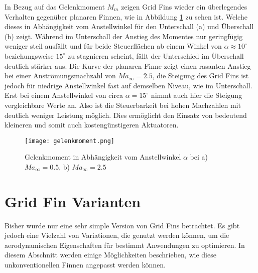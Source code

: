 In Bezug auf das Gelenkmoment $M_m$ zeigen Grid Fins wieder ein überlegendes Verhalten gegenüber planaren Finnen, wie in Abbildung \ref{abb_Mm-AoA} zu sehen ist. Welche dieses in Abhängigkeit vom Anstellwinkel für den Unterschall (a) und Überschall (b) zeigt. Während im Unterschall der Anstieg des Momentes nur geringfügig weniger steil ausfällt und für beide Steuerflächen ab einem Winkel von $\alpha \approx 10^\circ$ beziehungsweise $15^\circ$ zu stagnieren scheint, fällt der Unterschied im Überschall deutlich stärker aus. Die Kurve der planaren Finne zeigt einen rasanten Anstieg bei einer Anströmungsmachzahl von $Ma_\infty = 2.5$, die Steigung des Grid Fins ist jedoch für niedrige Anstellwinkel fast auf demselben Niveau, wie im Unterschall. Erst bei einem Anstellwinkel von circa $\alpha = 15^\circ$ nimmt auch hier die Steigung vergleichbare Werte an. Also ist die Steuerbarkeit bei hohen Machzahlen mit deutlich weniger Leistung möglich. Dies ermöglicht den Einsatz von bedeutend kleineren und somit auch kostengünstigeren Aktuatoren. 
\begin{figure}[h]
	\centering
	\texttt{[image: gelenkmoment.png]}
	\begin{flushright}
	\end{flushright}
	\caption{Gelenkmoment in Abhängigkeit vom Anstellwinkel $\alpha$ bei a) \ensuremath{Ma_\infty=0.5}, b) $Ma_\infty=2.5$}
	\label{abb_Mm-AoA}
\end{figure}

\section{Grid Fin Varianten}
Bisher wurde nur eine sehr simple Version von Grid Fins betrachtet. Es gibt jedoch eine Vielzahl von Variationen, die genutzt werden können, um die aerodynamischen Eigenschaften für bestimmt Anwendungen zu optimieren. In diesem Abschnitt werden einige Möglichkeiten beschrieben, wie diese unkonventionellen Finnen angepasst werden können.
